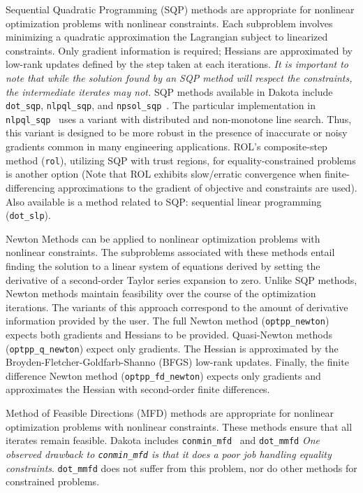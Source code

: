 Sequential Quadratic Programming (SQP) methods are appropriate
for nonlinear optimization problems with nonlinear constraints.  Each
subproblem involves minimizing a quadratic approximation the
Lagrangian subject to linearized constraints. Only gradient
information is required; Hessians are approximated by low-rank updates
defined by the step taken at each iterations. \emph{It is important to note
that while the solution found by an SQP method will respect the
constraints, the intermediate iterates may not.} SQP methods available
in Dakota include \texttt{dot\_sqp}, \texttt{nlpql\_sqp}, and
\texttt{npsol\_sqp}~\cite{Gil86}. The particular implementation in
\texttt{nlpql\_sqp}~\cite{Sch04} uses a variant with distributed and
non-monotone line search. Thus, this variant is designed to be more
robust in the presence of inaccurate or noisy gradients common in many
engineering applications. ROL's composite-step method (\texttt{rol}), 
utilizing SQP with trust regions, for equality-constrained problems is 
another option (Note that ROL exhibits slow/erratic convergence 
when finite-differencing approximations to the gradient of objective and 
constraints are used). Also available is a method related to SQP: 
sequential linear programming (\texttt{dot\_slp}).

Newton Methods can be applied to nonlinear optimization problems
with nonlinear constraints. The subproblems associated with these
methods entail finding the solution to a linear system of equations
derived by setting the derivative of a second-order Taylor series
expansion to zero.  Unlike SQP methods, Newton methods maintain
feasibility over the course of the optimization iterations.  The
variants of this approach correspond to the amount of derivative
information provided by the user.  The full Newton method
(\texttt{optpp\_newton}) expects both gradients and Hessians to be
provided.  Quasi-Newton methods (\texttt{optpp\_q\_newton}) expect 
only gradients. The Hessian is approximated by the 
Broyden-Fletcher-Goldfarb-Shanno (BFGS) low-rank updates.  Finally, 
the finite difference Newton method (\texttt{optpp\_fd\_newton}) 
expects only gradients and approximates the Hessian with second-order 
finite differences.

Method of Feasible Directions (MFD) methods are appropriate for
nonlinear optimization problems with nonlinear constraints.  These
methods ensure that all iterates remain feasible.  Dakota includes
\texttt{conmin\_mfd}~\cite{Van78} and \texttt{dot\_mmfd} \emph{One
observed drawback to \texttt{conmin\_mfd} is that it does a poor job
handling equality constraints}. \texttt{dot\_mmfd} does not
suffer from this problem, nor do other methods for constrained
problems.

